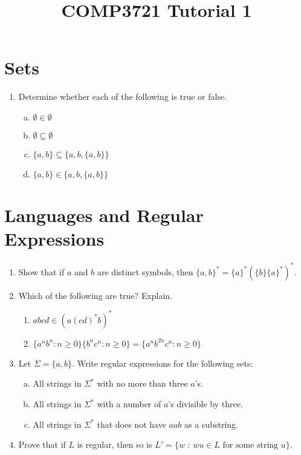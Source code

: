 \documentclass[a4paper]{article}
\date{}
\author{}
\title{COMP3721 Tutorial 1}
\theoremstyle{definition}
\numberwithin{equation}{subsection}
\begin{document}
\maketitle
\section{Sets}
\begin{enumerate}[1.]
\item Determine whether each of the following is true or false.
    \begin{enumerate}[(a)]
        \item $\emptyset \in \emptyset$
        \item $\emptyset \subseteq \emptyset$
        \item $\{a,b\}\subseteq \{a,b,\{a,b\}\}$
        \item $\{a,b\}\in \{a,b,\{a,b\}\}$
    \end{enumerate}
\end{enumerate}
\section{Languages and Regular Expressions}
\begin{enumerate}[1.]
\item Show that if $a$ and $b$ are distinct symbols, then $\{a,b\}^* = \{a\}^*(\{b\}\{a\}^*)^*$.
\item Which of the following are true? Explain.
    \begin{enumerate}
        \item $abcd \in (a(cd)^*b)^*$
        \item $\{a^nb^n : n \geq 0\}\{b^nc^n : n\geq 0\} = \{a^nb^{2n}c^n : n\geq 0\}$
    \end{enumerate}
\item Let $\Sigma = \{a, b\}$. Write regular expressions for the following sets:
    \begin{enumerate}[(a)]
        \item All strings in $\Sigma^*$ with no more than three $a$'s.
        \item All strings in $\Sigma^*$ with a number of $a$'s divisible by three.
        \item All strings in $\Sigma^*$ that does not have $aab$ as a substring.
    \end{enumerate}
\item Prove that if $L$ is regular, then so is $L' = \{\textrm{$w$ : $wu \in L$ for some string $u$}\}$.
\end{enumerate}
\end{document}
